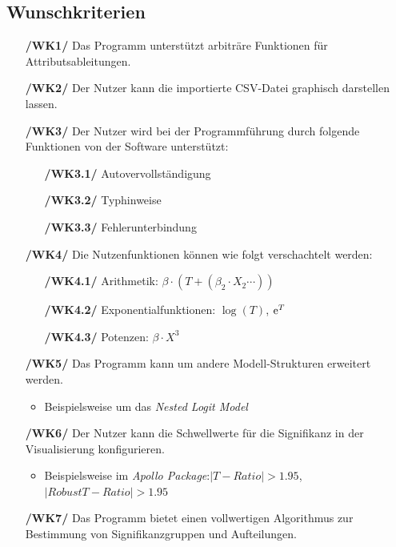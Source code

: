\documentclass{article}
\begin{document}
\subsection{Wunschkriterien}
\begin{itemize}
    \item[\textbf{/WK1/}] Das Programm unterstützt arbiträre Funktionen für Attributsableitungen.
    \item[\textbf{/WK2/}] Der Nutzer kann die importierte CSV-Datei graphisch darstellen lassen.
    \item[\textbf{/WK3/}] Der Nutzer wird bei der Programmführung durch folgende Funktionen von der Software unterstützt:
    \begin{itemize}[leftmargin=.7in]
        \item[\textbf{/WK3.1/}] Autovervollständigung
        \item[\textbf{/WK3.2/}] Typhinweise
        \item[\textbf{/WK3.3/}] Fehlerunterbindung
    \end{itemize}
    \item[\textbf{/WK4/}] Die Nutzenfunktionen können wie folgt verschachtelt werden:
    \begin{itemize}[leftmargin=.7in]
        \item[\textbf{/WK4.1/}] Arithmetik: $\beta \cdot (T + (\beta_2 \cdot X_2 \cdots))$
        \item[\textbf{/WK4.2/}] Exponentialfunktionen: $\log(T)$, ${\rm e}^T$
        \item[\textbf{/WK4.3/}] Potenzen: $\beta \cdot X^3$
    \end{itemize}
    \item[\textbf{/WK5/}] Das Programm kann um andere Modell-Strukturen erweitert werden.
    \begin{itemize}
        \item Beispielsweise um das \textit{Nested Logit Model}
    \end{itemize}
    \item[\textbf{/WK6/}] Der Nutzer kann die Schwellwerte für die Signifikanz in der Visualisierung konfigurieren.
    \begin{itemize}
        \item Beispielsweise im \textit{Apollo Package}:\newline $|T-Ratio | > 1.95$, $|Robust T-Ratio | > 1.95$
    \end{itemize}    
    \item[\textbf{/WK7/}] Das Programm bietet einen vollwertigen Algorithmus zur Bestimmung von Signifikanzgruppen und Aufteilungen.
\end{itemize}
\end{document}
